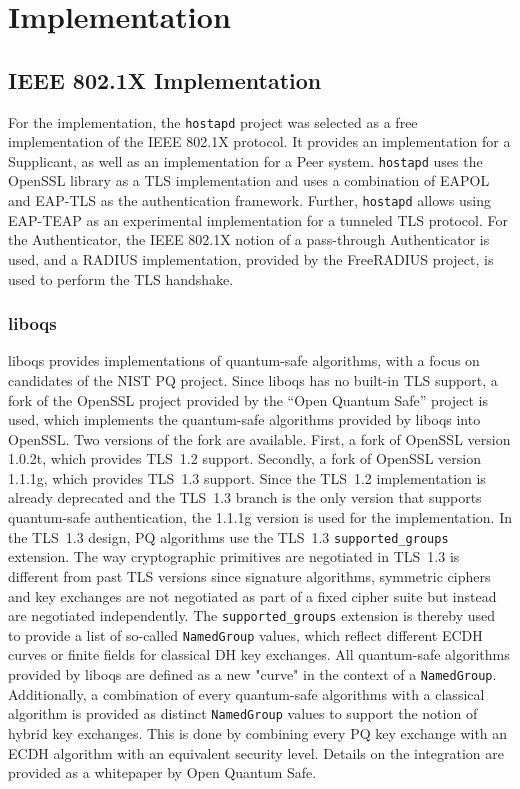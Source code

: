\chapter{Implementation}


\section{IEEE 802.1X Implementation}

For the implementation, the \texttt{hostapd} project was selected as a free implementation of the IEEE 802.1X protocol. It provides an implementation for a Supplicant, as well as an implementation for a Peer system. \texttt{hostapd} uses the OpenSSL library as a TLS implementation and uses a combination of EAPOL and EAP-TLS as the authentication framework. Further, \texttt{hostapd} allows using EAP-TEAP as an experimental implementation for a tunneled TLS protocol. For the Authenticator, the IEEE 802.1X notion of a pass-through Authenticator is used, and a RADIUS implementation, provided by the FreeRADIUS project, is used to perform the TLS handshake.

\subsection{liboqs}

liboqs\cite{stebila2016post} provides implementations of quantum-safe algorithms, with a focus on candidates of the \ac{NIST} \ac{PQ} project. Since liboqs has no built-in TLS support, a fork of the OpenSSL project provided by the ``Open Quantum Safe'' project is used, which implements the quantum-safe algorithms provided by liboqs into OpenSSL. Two versions of the fork are available. First, a fork of OpenSSL version 1.0.2t, which provides TLS~1.2 support. Secondly, a fork of OpenSSL version 1.1.1g, which provides TLS~1.3 support. Since the TLS~1.2 implementation is already deprecated and the TLS~1.3 branch is the only version that supports quantum-safe authentication, the 1.1.1g version is used for the implementation. In the TLS~1.3 design, \ac{PQ} algorithms use the TLS~1.3 \texttt{supported\_groups} extension. The way cryptographic primitives are negotiated in TLS~1.3 is different from past TLS versions since signature algorithms, symmetric ciphers and key exchanges are not negotiated as part of a fixed cipher suite but instead are negotiated independently. The \texttt{supported\_groups} extension is thereby used to provide a list of so-called \texttt{NamedGroup} values, which reflect different \ac{ECDH} curves or finite fields for classical DH key exchanges. All quantum-safe algorithms provided by liboqs are defined as a new "curve" in the context of a \texttt{NamedGroup}. Additionally, a combination of every quantum-safe algorithms with a classical algorithm is provided as distinct \texttt{NamedGroup} values to support the notion of hybrid key exchanges. This is done by combining every \ac{PQ} key exchange with an \ac{ECDH} algorithm with an equivalent security level. Details on the integration are provided as a whitepaper by Open Quantum Safe\cite{crockett2019prototyping}.

